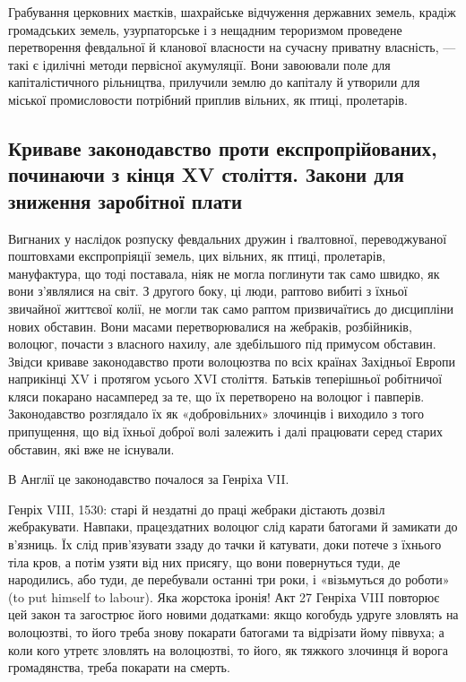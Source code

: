 Грабування церковних маєтків, шахрайське відчуження державних
земель, крадіж громадських земель, узурпаторське і з
нещадним тероризмом проведене перетворення февдальної й
кланової власности на сучасну приватну власність, — такі є
ідилічні методи первісної акумуляції. Вони завоювали поле
для капіталістичного рільництва, прилучили землю до капіталу
й утворили для міської промисловости потрібний приплив вільних,
як птиці, пролетарів.

\subsection{Криваве законодавство проти експропрійованих, починаючи
з кінця XV століття. Закони для зниження заробітної плати}

Вигнаних у наслідок розпуску февдальних дружин і ґвалтовної,
переводжуваної поштовхами експропріяції земель, цих
вільних, як птиці, пролетарів, мануфактура, що тоді поставала,
ніяк не могла поглинути так само швидко, як вони з’являлися
на світ. З другого боку, ці люди, раптово вибиті з їхньої звичайної
життєвої колії, не могли так само раптом призвичаїтись до
дисципліни нових обставин. Вони масами перетворювалися на
жебраків, розбійників, волоцюг, почасти з власного нахилу,
але здебільшого під примусом обставин. Звідси криваве законодавство
проти волоцюзтва по всіх країнах Західньої Европи
наприкінці XV і протягом усього XVI століття. Батьків теперішньої
робітничої кляси покарано насамперед за те, що їх перетворено
на волоцюг і павперів. Законодавство розглядало
їх як «добровільних» злочинців і виходило з того припущення,
що від їхньої доброї волі залежить і далі працювати серед старих
обставин, які вже не існували.

В Англії це законодавство почалося за Генріха VII.

Генріх VIII, 1530: старі й нездатні до праці жебраки дістають
дозвіл жебракувати. Навпаки, працездатних волоцюг слід карати
батогами й замикати до в’язниць. Їх слід прив’язувати ззаду до
тачки й катувати, доки потече з їхнього тіла кров, а потім узяти
від них присягу, що вони повернуться туди, де народились,
або туди, де перебували останні три роки, і «візьмуться до роботи»
(to put himself to labour). Яка жорстока іронія! Акт 27
Генріха VIII повторює цей закон та загострює його новими додатками:
якщо когобудь удруге зловлять на волоцюзтві, то його
треба знову покарати батогами та відрізати йому піввуха; а
коли кого утретє зловлять на волоцюзтві, то його, як тяжкого
злочинця й ворога громадянства, треба покарати на смерть.

